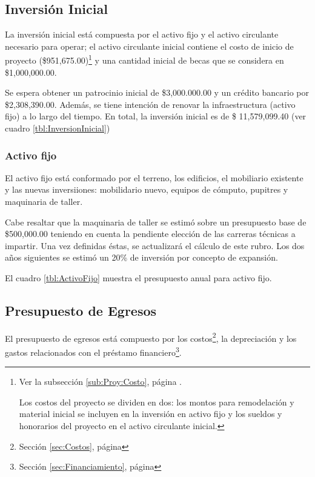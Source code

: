 \subsection{Inversión Inicial}
\label{sub:oper:InversionInicial}

La inversión inicial está compuesta por el activo fijo y el activo circulante necesario para operar; el activo circulante inicial contiene el costo de inicio de proyecto (\$951,675.00)\footnote{Ver la subsección \ref{sub:Proy:Costo}, página \pageref{sub:Proy:Costo}.

Los costos del proyecto se dividen en dos: los montos para remodelación y material inicial se incluyen en la inversión en activo fijo y los sueldos y honorarios del proyecto en el activo circulante inicial.} y una cantidad inicial de becas que se considera en \$1,000,000.00.

Se espera obtener un patrocinio inicial de \$3,000.000.00 y un crédito bancario por \$2,308,390.00. Además, se tiene intención de renovar la infraestructura (activo fijo) a lo largo del tiempo. En total, la inversión inicial es de \$ 11,579,099.40 (ver cuadro \ref{tbl:InversionInicial})



\subsubsection{Activo fijo}

El activo fijo está conformado por el terreno, los edificios, el mobiliario existente y las nuevas inversiiones: mobilidario nuevo, equipos de cómputo, pupitres y maquinaria de taller.

Cabe resaltar que la maquinaria de taller se estimó sobre un presupuesto base de \$500,000.00 teniendo en cuenta la pendiente elección de las carreras técnicas a impartir. Una vez definidas éstas, se actualizará el cálculo de este rubro. Los dos años siguientes se estimó un 20\% de inversión por concepto de expansión.

El cuadro \ref{tbl:ActivoFijo} muestra el presupuesto anual para activo fijo.



\subsection{Presupuesto de Egresos}

El presupuesto de egresos está compuesto por los costos\footnote{Sección \ref{sec:Costos}, página \pageref{sec:Costos}}, la depreciación y los gastos relacionados con el préstamo financiero\footnote{Sección \ref{sec:Financiamiento}, página \pageref{sec:Financiamiento}}.

